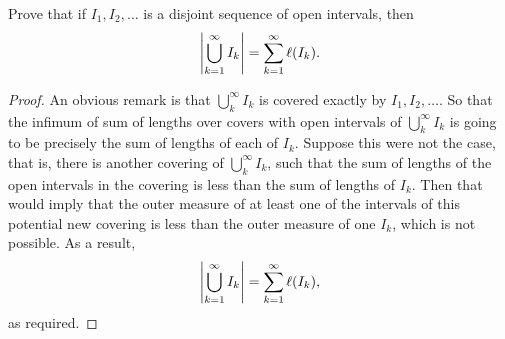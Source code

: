 \begin{exercise}{11}
Prove that if $I_1,I_2,\dots$ is a disjoint sequence of open intervals, then
\begin{align*}
    \left\lvert \bigcup_{k=1}^\infty I_k\right\rvert = \sum_{k=1}^\infty \ell(I_k).
\end{align*}
\end{exercise}
\begin{proof}
An obvious remark is that $\bigcup_k^\infty I_k$ is covered exactly by $I_1,I_2,\dots$.
So that the infimum of sum of lengths over covers with open intervals of $\bigcup_k^\infty I_k$ is going to be precisely the sum of lengths of each of $I_k$.
Suppose this were not the case, that is, there is another covering of $\bigcup_k^\infty I_k$, such that the sum of lengths of the open intervals in the covering is less than the sum of lengths of $I_k$.
Then that would imply that the outer measure of at least one of the intervals of this potential new covering is less than the outer measure of one $I_k$, which is not possible.
As a result,
\begin{align*}
    \left\lvert \bigcup_{k=1}^\infty I_k\right\rvert = \sum_{k=1}^\infty \ell(I_k),
\end{align*}
as required.
\end{proof} 

